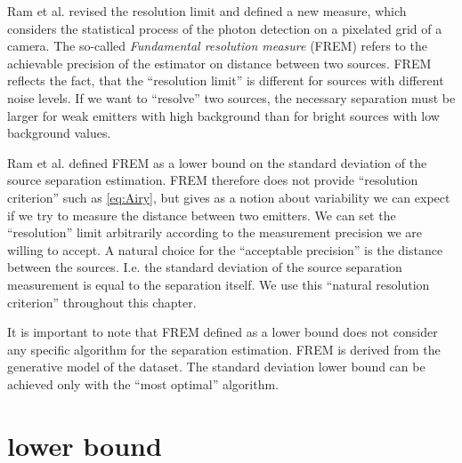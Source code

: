 Ram et al. \cite{Ram2006,Ram2006b} revised the resolution limit and defined a new measure, which considers the statistical process of the photon detection on a pixelated grid of a camera. The so-called \emph{Fundamental resolution measure} (FREM) refers to the achievable precision of the estimator on distance between two sources. FREM reflects the fact, that the ``resolution limit'' is different for sources with different noise levels. If we want to ``resolve'' two sources, the necessary separation must be larger for weak emitters with high background than for bright sources with low background values.

Ram et al. defined FREM as a \CR lower bound on the standard deviation of the source separation estimation. FREM therefore does not provide ``resolution criterion'' such as \autoref{eq:Airy}, but gives as a notion about variability we can expect if we try to measure the distance between two emitters. We can set the ``resolution'' limit arbitrarily according to the measurement precision we are willing to accept. A natural choice for the ``acceptable precision'' is the distance between the sources. I.e. the standard deviation of the source separation measurement is equal to the separation itself. We use this ``natural resolution criterion'' throughout this chapter. 

It is important to note that FREM defined as a \CR lower bound does not consider any specific algorithm for the separation estimation. FREM is derived from the generative model of the dataset.  The standard deviation lower bound can be achieved only with the ``most optimal'' algorithm. 




\section{\CR lower bound\label{sec:CR}}


